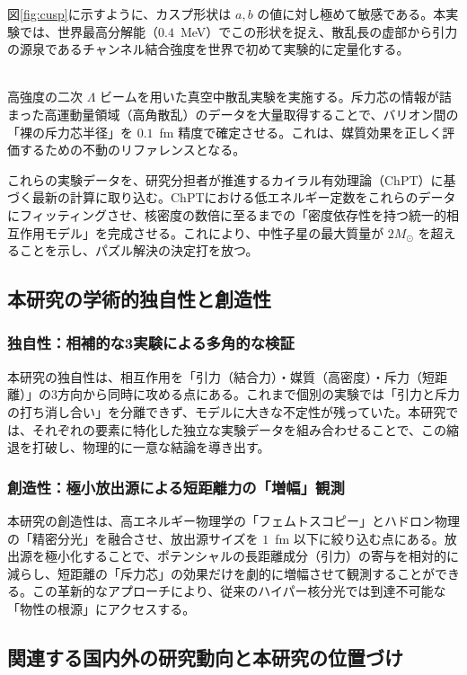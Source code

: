 \documentclass[11pt,a4j,dvipdfmx]{jarticle} 					%
\newcommand{\研究課題名}{加速器実験による短距離バリオン間相互作用の解明と中性子星ハイペロンパズルの解決}
\newcommand{\研究機関名}{東北大学}
\newcommand{\研究代表者氏名}{市川裕大}
\newcommand{\研究期間の最終元号年度}{13}  %
\begin{document}
\begin{description}
    図\ref{fig:cusp}に示すように、カスプ形状は $a, b$ の値に対し極めて敏感である。本実験では、世界最高分解能（$0.4$~MeV）でこの形状を捉え、散乱長の虚部から引力の源泉であるチャンネル結合強度を世界で初めて実験的に定量化する。
    \item[3. 真空中散乱実験（HYPS/E86）：裸の斥力芯サイズの直接測定]\mbox{}\\
    高強度の二次 $\Lambda$ ビームを用いた真空中散乱実験を実施する。斥力芯の情報が詰まった高運動量領域（高角散乱）のデータを大量取得することで、バリオン間の「裸の斥力芯半径」を $0.1$~fm 精度で確定させる。これは、媒質効果を正しく評価するための不動のリファレンスとなる。
\end{description}

これらの実験データを、研究分担者が推進するカイラル有効理論（ChPT）に基づく最新の計算に取り込む。ChPTにおける低エネルギー定数をこれらのデータにフィッティングさせ、核密度の数倍に至るまでの「密度依存性を持つ統一的相互作用モデル」を完成させる。これにより、中性子星の最大質量が $2M_\odot$ を超えることを示し、パズル解決の決定打を放つ。

\subsection{本研究の学術的独自性と創造性}
\subsubsection{独自性：相補的な3実験による多角的な検証}
本研究の独自性は、相互作用を「引力（結合力）・媒質（高密度）・斥力（短距離）」の3方向から同時に攻める点にある。これまで個別の実験では「引力と斥力の打ち消し合い」を分離できず、モデルに大きな不定性が残っていた。本研究では、それぞれの要素に特化した独立な実験データを組み合わせることで、この縮退を打破し、物理的に一意な結論を導き出す。

\subsubsection{創造性：極小放出源による短距離力の「増幅」観測}
本研究の創造性は、高エネルギー物理学の「フェムトスコピー」とハドロン物理の「精密分光」を融合させ、放出源サイズを $1$~fm 以下に絞り込む点にある。放出源を極小化することで、ポテンシャルの長距離成分（引力）の寄与を相対的に減らし、短距離の「斥力芯」の効果だけを劇的に増幅させて観測することができる。この革新的なアプローチにより、従来のハイパー核分光では到達不可能な「物性の根源」にアクセスする。

\subsection{関連する国内外の研究動向と本研究の位置づけ}
\end{document}
